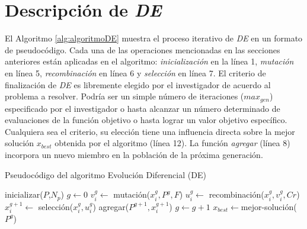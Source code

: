 \section{Descripción de \textit{DE}}


El Algoritmo \ref{alg:algoritmoDE} muestra el proceso iterativo de \textit{DE} en un formato de pseudocódigo. Cada una de las operaciones mencionadas en las secciones anteriores están aplicadas en el algoritmo: \textit{inicialización} en la línea 1, \textit{mutación} en línea 5, \textit{recombinación} en línea 6 y \textit{selección} en línea 7. El criterio de finalización de \textit{DE} es libremente elegido por el investigador de acuerdo al problema a resolver. Podría ser un simple número de iteraciones ($max_{gen}$) especificado por el investigador o hasta alcanzar un número determinado de evaluaciones de la función objetivo o hasta lograr un valor objetivo específico. Cualquiera sea el criterio, su elección tiene una influencia directa sobre la mejor solución $x_{best}$ obtenida por el algoritmo (línea 12). La función \textit{agregar} (línea 8) incorpora un nuevo miembro en la población de la próxima generación.


\begin{algorithm} [H]
    \caption{Pseudocódigo del algoritmo Evolución Diferencial (DE)} \label{alg:algoritmoDE}
    \begin{algorithmic} [1]
        \State inicializar($P$,$N_p$) 
        \State $g \leftarrow 0$
                \State $v_{i}^g \leftarrow $ mutación($x_{i}^g, P^g, F$) 
                \State $u_{i}^g \leftarrow $ recombinación($x_{i}^g, v_{i}^g, Cr$)
                \State $x_{i}^{g+1} \leftarrow $ selección($x_{i}^g, u_{i}^g$)
                \State agregar($P^{g+1}, x_{i}^{g+1}$) 
            \EndFor
            \State $g \leftarrow g+1$ 
        \EndWhile
        \State$x_{best} \leftarrow $mejor-solución($P^{g}$)

    \end{algorithmic}
\end{algorithm}
